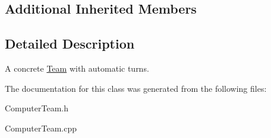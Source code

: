 \subsection*{Additional Inherited Members}


\subsection{Detailed Description}
A concrete \hyperlink{class_team}{Team} with automatic turns. 

The documentation for this class was generated from the following files\+:\begin{DoxyCompactItemize}
\item 
Computer\+Team.\+h\item 
Computer\+Team.\+cpp\end{DoxyCompactItemize}
